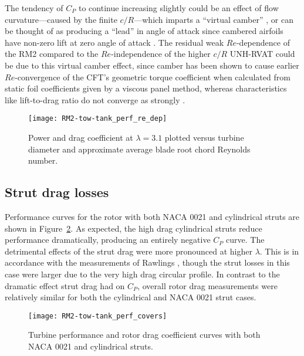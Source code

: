 The tendency of $C_P$ to continue increasing slightly could be an effect of flow
curvature---caused by the finite $c/R$---which imparts a ``virtual camber''
\cite{Migliore1980}, or can be thought of as producing a ``lead'' in angle of
attack since cambered airfoils have non-zero lift at zero angle of attack
\cite{Goude2012}. The residual weak $Re$-dependence of the RM2 compared to the
$Re$-independence of the higher $c/R$ UNH-RVAT could be due to this virtual
camber effect, since camber has been shown to cause earlier $Re$-convergence of
the CFT's geometric torque coefficient when calculated from static foil
coefficients given by a viscous panel method, whereas characteristics like
lift-to-drag ratio do not converge as strongly \cite{Bachant2016-RVAT-Re-dep}.

\begin{figure}
    \centering

    \texttt{[image: RM2-tow-tank\_perf\_re\_dep]}
    
    \caption{Power and drag coefficient at $\lambda=3.1$ plotted versus turbine
        diameter and approximate average blade root chord Reynolds number.}
    
    \label{fig:perf-re-dep}
\end{figure}


\subsection{Strut drag losses}

Performance curves for the rotor with both NACA 0021 and cylindrical struts are
shown in Figure~\ref{fig:perf-covers}. As expected, the high drag cylindrical
struts reduce performance dramatically, producing an entirely negative $C_P$
curve. The detrimental effects of the strut drag were more pronounced at higher
$\lambda$. This is in accordance with the measurements of Rawlings
\cite{Rawlings2008}, though the strut losses in this case were larger due to the
very high drag circular profile. In contrast to the dramatic effect strut drag
had on $C_P$, overall rotor drag measurements were relatively similar for both
the cylindrical and NACA 0021 strut cases.

\begin{figure}
    \centering

    \texttt{[image: RM2-tow-tank\_perf\_covers]}
    
    \caption{Turbine performance and rotor drag coefficient curves with both
        NACA 0021 and cylindrical struts.}
    
    \label{fig:perf-covers}
\end{figure}

